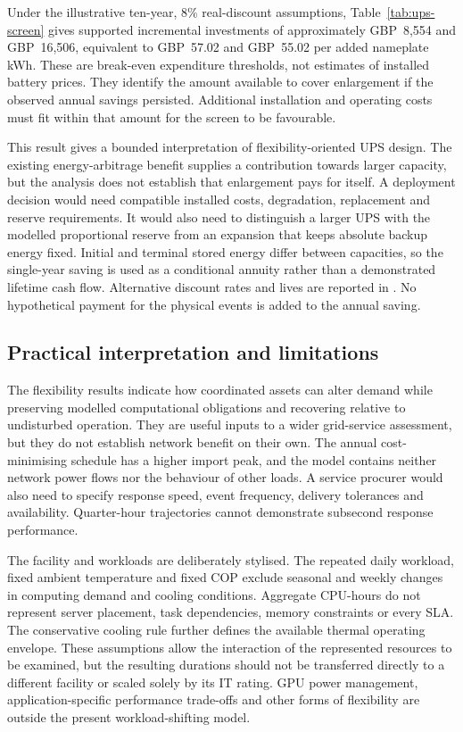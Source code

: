 

Under the illustrative ten-year, 8\% real-discount assumptions, Table~\ref{tab:ups-screen} gives supported incremental investments of approximately GBP~8,554 and GBP~16,506, equivalent to GBP~57.02 and GBP~55.02 per added nameplate kWh. These are break-even expenditure thresholds, not estimates of installed battery prices. They identify the amount available to cover enlargement if the observed annual savings persisted. Additional installation and operating costs must fit within that amount for the screen to be favourable.

This result gives a bounded interpretation of flexibility-oriented UPS design. The existing energy-arbitrage benefit supplies a contribution towards larger capacity, but the analysis does not establish that enlargement pays for itself. A deployment decision would need compatible installed costs, degradation, replacement and reserve requirements. It would also need to distinguish a larger UPS with the modelled proportional reserve from an expansion that keeps absolute backup energy fixed. Initial and terminal stored energy differ between capacities, so the single-year saving is used as a conditional annuity rather than a demonstrated lifetime cash flow. Alternative discount rates and lives are reported in . No hypothetical payment for the physical events is added to the annual saving.

\subsection{Practical interpretation and limitations}
The flexibility results indicate how coordinated assets can alter demand while preserving modelled computational obligations and recovering relative to undisturbed operation. They are useful inputs to a wider grid-service assessment, but they do not establish network benefit on their own. The annual cost-minimising schedule has a higher import peak, and the model contains neither network power flows nor the behaviour of other loads. A service procurer would also need to specify response speed, event frequency, delivery tolerances and availability. Quarter-hour trajectories cannot demonstrate subsecond response performance.

The facility and workloads are deliberately stylised. The repeated daily workload, fixed ambient temperature and fixed COP exclude seasonal and weekly changes in computing demand and cooling conditions. Aggregate CPU-hours do not represent server placement, task dependencies, memory constraints or every SLA. The conservative cooling rule further defines the available thermal operating envelope. These assumptions allow the interaction of the represented resources to be examined, but the resulting durations should not be transferred directly to a different facility or scaled solely by its IT rating. GPU power management, application-specific performance trade-offs and other forms of flexibility are outside the present workload-shifting model.

